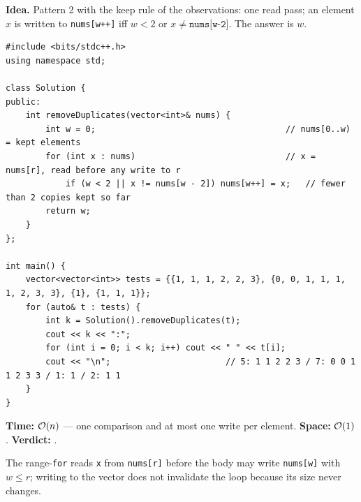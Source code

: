 \begin{algorithmbox}
\textbf{Idea.} Pattern 2 with the keep rule of the observations: one read pass; an element $x$ is written to \texttt{nums[w++]} iff $w < 2$ or $x \ne \texttt{nums[w-2]}$. The answer is $w$.
\begin{lstlisting}[style=cpp]
#include <bits/stdc++.h>
using namespace std;

class Solution {
public:
    int removeDuplicates(vector<int>& nums) {
        int w = 0;                                      // nums[0..w) = kept elements
        for (int x : nums)                              // x = nums[r], read before any write to r
            if (w < 2 || x != nums[w - 2]) nums[w++] = x;   // fewer than 2 copies kept so far
        return w;
    }
};

int main() {
    vector<vector<int>> tests = {{1, 1, 1, 2, 2, 3}, {0, 0, 1, 1, 1, 1, 2, 3, 3}, {1}, {1, 1, 1}};
    for (auto& t : tests) {
        int k = Solution().removeDuplicates(t);
        cout << k << ":";
        for (int i = 0; i < k; i++) cout << " " << t[i];
        cout << "\n";                       // 5: 1 1 2 2 3 / 7: 0 0 1 1 2 3 3 / 1: 1 / 2: 1 1
    }
}
\end{lstlisting}
\begin{complexitybox}
\textbf{Time:} $\mathcal{O}(n)$ --- one comparison and at most one write per element. \textbf{Space:} $\mathcal{O}(1)$. \textbf{Verdict:} \ac{}.
\end{complexitybox}
\end{algorithmbox}

The range-\texttt{for} reads \texttt{x} from \texttt{nums[r]} before the body may write \texttt{nums[w]} with $w \le r$; writing to the vector does not invalidate the loop because its size never changes.

